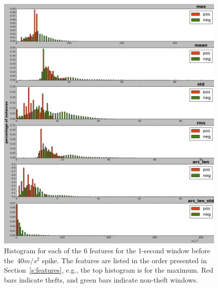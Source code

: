 

\begin{figure}[t]
\centering
\begin{minipage}[t]{\columnwidth}
\includegraphics[width=\columnwidth]{hist_features_before_win_size_1_2.png}
\caption{Histogram for each of the 6 features for the 1-second window before the~$40 m/s^2$ spike.  The features are listed in the order presented in Section~\ref{s:features}, e.g., the top histogram is for the maximum.  Red bars indicate thefts, and green bars indicate non-theft windows.}
\label{fig:beforehist}
\end{minipage}
\hfill
\begin{minipage}[t]{\columnwidth}

\end{minipage}
\end{figure}
